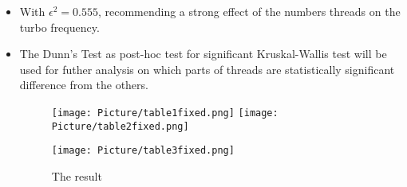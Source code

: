 \documentclass[a4paper]{article}
\begin{document}
\begin{itemize}
    \item[] With $\epsilon^2 = 0.555$, recommending a strong effect of the numbers threads on the turbo frequency.
    
    \item[] The Dunn's Test as post-hoc test for significant Kruskal-Wallis test will be used for futher analysis on which parts of threads are statistically significant difference from the others.

    \begin{figure}[H]
        \centering
        \texttt{[image: Picture/table1fixed.png]}
        \hfill
        \texttt{[image: Picture/table2fixed.png]}
        \label{7.1.8}
    \end{figure}
    
    \begin{figure}[H]
        \centering
        \texttt{[image: Picture/table3fixed.png]}
        \hfill
        \caption{The result}
        \label{7.1.9}
    \end{figure}
\end{itemize}
\end{document}
